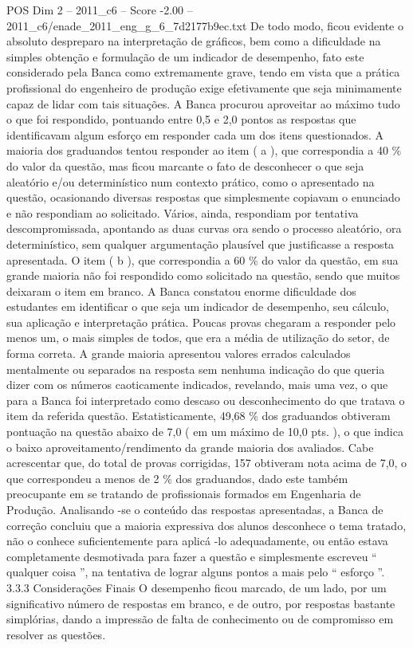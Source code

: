 \begin{textsample}{POS Dim 2 – 2011\_c6 – Score -2.00 – 2011\_c6/enade\_2011\_eng\_g\_6\_7d2177b9ec.txt}
De todo modo, ficou evidente o absoluto despreparo na interpretação de gráficos, bem como a dificuldade na simples obtenção e formulação de um indicador de desempenho, fato este considerado pela Banca como extremamente grave, tendo em vista que a prática profissional do engenheiro de produção exige efetivamente que seja minimamente capaz de lidar com tais situações.
A Banca procurou aproveitar ao máximo tudo o que foi respondido, pontuando entre 0,5 e 2,0 pontos as respostas que identificavam algum esforço em responder cada um dos itens questionados.
A maioria dos graduandos tentou responder ao item ( a ), que correspondia a 40 \% do valor da questão, mas ficou marcante o fato de desconhecer o que seja aleatório e/ou determinístico num contexto prático, como o apresentado na questão, ocasionando diversas respostas que simplesmente copiavam o enunciado e não respondiam ao solicitado.
Vários, ainda, respondiam por tentativa descompromissada, apontando as duas curvas ora sendo o processo aleatório, ora determinístico, sem qualquer argumentação plausível que justificasse a resposta apresentada.
O item ( b ), que correspondia a 60 \% do valor da questão, em sua grande maioria não foi respondido como solicitado na questão, sendo que muitos deixaram o item em branco.
A Banca constatou enorme dificuldade dos estudantes em identificar o que seja um indicador de desempenho, seu cálculo, sua aplicação e interpretação prática.
Poucas provas chegaram a responder pelo menos um, o mais simples de todos, que era a média de utilização do setor, de forma correta.
A grande maioria apresentou valores errados calculados mentalmente ou separados na resposta sem nenhuma indicação do que queria dizer com os números caoticamente indicados, revelando, mais uma vez, o que para a Banca foi interpretado como descaso ou desconhecimento do que tratava o item da referida questão.
Estatisticamente, 49,68 \% dos graduandos obtiveram pontuação na questão abaixo de 7,0 ( em um máximo de 10,0 pts. ), o que indica o baixo aproveitamento/rendimento da grande maioria dos avaliados.
Cabe acrescentar que, do total de provas corrigidas, 157 obtiveram nota acima de 7,0, o que correspondeu a menos de 2 \% dos graduandos, dado este também preocupante em se tratando de profissionais formados em Engenharia de Produção.
Analisando -se o conteúdo das respostas apresentadas, a Banca de correção concluiu que a maioria expressiva dos alunos desconhece o tema tratado, não o conhece suficientemente para aplicá -lo adequadamente, ou então estava completamente desmotivada para fazer a questão e simplesmente escreveu “ qualquer coisa ”, na tentativa de lograr alguns pontos a mais pelo “ esforço ”. 3.3.3 Considerações Finais O desempenho ficou marcado, de um lado, por um significativo número de respostas em branco, e de outro, por respostas bastante simplórias, dando a impressão de falta de conhecimento ou de compromisso em resolver as questões.

\end{textsample}

